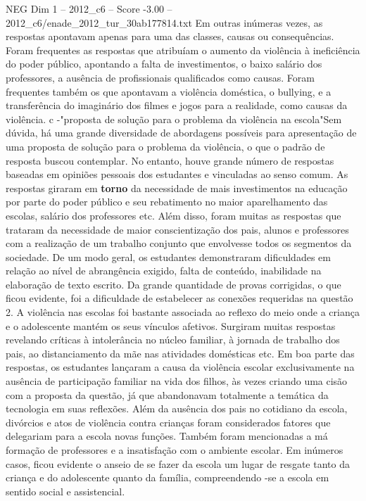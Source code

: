 \begin{textsample}{NEG Dim 1 – 2012\_c6 – Score -3.00 – 2012\_c6/enade\_2012\_tur\_30ab177814.txt}
Em outras inúmeras vezes, as respostas apontavam apenas para uma das classes, causas ou consequências.
Foram frequentes as respostas que atribuíam o aumento da violência à ineficiência do poder público, apontando a falta de investimentos, o baixo salário dos professores, a ausência de profissionais qualificados como causas.
Foram frequentes também os que apontavam a violência doméstica, o bullying, e a transferência do imaginário dos filmes e jogos para a realidade, como causas da violência. c -"proposta de solução para o problema da violência na escola"Sem dúvida, há uma grande diversidade de abordagens possíveis para apresentação de uma proposta de solução para o problema da violência, o que o padrão de resposta buscou contemplar.
No entanto, houve grande número de respostas baseadas em opiniões pessoais dos estudantes e vinculadas ao senso comum.
As respostas giraram em \textbf{torno} da necessidade de mais investimentos na educação por parte do poder público e seu rebatimento no maior aparelhamento das escolas, salário dos professores etc.
Além disso, foram muitas as respostas que trataram da necessidade de maior conscientização dos pais, alunos e professores com a realização de um trabalho conjunto que envolvesse todos os segmentos da sociedade.
De um modo geral, os estudantes demonstraram dificuldades em relação ao nível de abrangência exigido, falta de conteúdo, inabilidade na elaboração de texto escrito.
Da grande quantidade de provas corrigidas, o que ficou evidente, foi a dificuldade de estabelecer as conexões requeridas na questão 2.
A violência nas escolas foi bastante associada ao reflexo do meio onde a criança e o adolescente mantém os seus vínculos afetivos.
Surgiram muitas respostas revelando críticas à intolerância no núcleo familiar, à jornada de trabalho dos pais, ao distanciamento da mãe nas atividades domésticas etc.
Em boa parte das respostas, os estudantes lançaram a causa da violência escolar exclusivamente na ausência de participação familiar na vida dos filhos, às vezes criando uma cisão com a proposta da questão, já que abandonavam totalmente a temática da tecnologia em suas reflexões.
Além da ausência dos pais no cotidiano da escola, divórcios e atos de violência contra crianças foram considerados fatores que delegariam para a escola novas funções.
Também foram mencionadas a má formação de professores e a insatisfação com o ambiente escolar.
Em inúmeros casos, ficou evidente o anseio de se fazer da escola um lugar de resgate tanto da criança e do adolescente quanto da família, compreendendo -se a escola em sentido social e assistencial.

\end{textsample}
